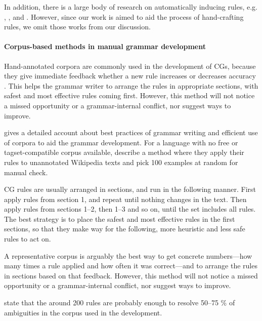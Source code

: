 In addition, there is a large body of research on automatically
inducing rules, e.g. \cite{inducing_cg1996}, \cite{lindberg_eineborg98ilp},
\cite{lager01transformation} and \cite{asfrent14}.
However, since our work is aimed to aid the process of hand-crafting rules, we omit those works from our discussion.


\paragraph{Corpus-based methods in manual grammar development}

Hand-annotated corpora are commonly used in the development of CGs, because they give immediate feedback whether a new rule increases or decreases accuracy \cite{voutilainen2004}.
This helps the grammar writer to arrange the rules in appropriate sections, with safest and most effective rules coming first.
However, this method will not notice a missed opportunity or a grammar-internal conflict, nor suggest ways to improve.

\cite{voutilainen2004} gives a detailed account about best practices of grammar writing and efficient use of corpora to aid the grammar development.
For a language with no free or tagset-compatible corpus available, \cite{tyers_reynolds2015} describe a method where they apply their rules to unannotated Wikipedia texts and pick 100 examples at random for manual check.

CG rules are usually arranged in sections, and run in the following manner. 
First apply rules from section 1, and repeat until nothing changes in the text. Then apply rules from sections 1--2, then 1--3 and so on, until the set includes all rules.
The best strategy is to place the safest and most effective rules in the first sections,
so that they make way for the following, more heuristic and less safe rules to act on.

A representative corpus is arguably the best way to get concrete numbers---how many times a rule applied and how often it was correct---and to arrange the rules in sections based on that feedback.
However, this method will not notice a missed opportunity or a grammar-internal conflict, nor suggest ways to improve.

\cite{voutilainen2004} state that the around 200 rules are probably enough to resolve 50--75 \% of ambiguities in the corpus used in the development. 


